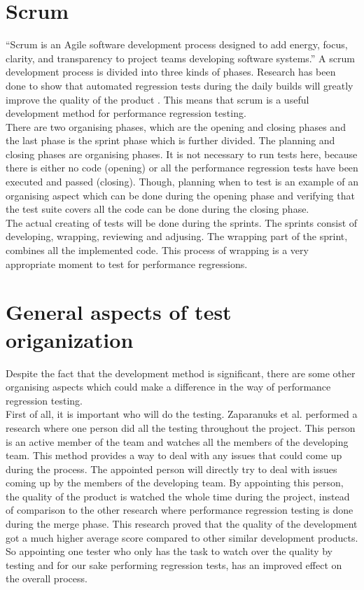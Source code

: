 \section{Scrum}
``Scrum is an Agile software development process designed to add energy, focus, clarity, and transparency to project teams developing software systems.''\cite{sutherland2007distributed} A scrum development process is divided into three kinds of phases. Research has been done to show that automated regression tests during the daily builds will greatly improve the quality of the product \cite{Future_of_Scrum}. This means that scrum is a useful development method for performance regression testing. \\ There are two organising phases, which are the opening and closing phases and the last phase is the sprint phase which is further divided. The planning and closing phases are organising phases. It is not necessary to run tests here, because there is either no code (opening) or all the performance regression tests have been executed and passed (closing). Though, planning when to test is an example of an organising aspect which can be done during the opening phase and verifying that the test suite covers all the code can be done during the closing phase. \\ The actual creating of tests will be done during the sprints. The sprints consist of developing, wrapping, reviewing and adjusing. The wrapping part of the sprint, combines all the implemented code. This process of wrapping is a very appropriate moment to test for performance regressions. \\

\section{General aspects of test origanization}
Despite the fact that the development method is significant, there are some other organising aspects which could make a difference in the way of performance regression testing. \\
First of all, it is important who will do the testing. Zaparanuks et al. performed a research where one person did all the testing throughout the project. \cite{sutherland2009fully} This person is an active member of the team and watches all the members of the developing team. This method provides a way to deal with any issues that could come up during the process. The appointed person will directly try to deal with issues coming up by the members of the developing team. By appointing this person, the quality of the product is watched the whole time during the project, instead of comparison to the other research where performance regression testing is done during the merge phase. This research proved that the quality of the development got a much higher average score compared to other similar development products. So appointing one tester who only has the task to watch over the quality by testing and for our sake performing regression tests, has an improved effect on the overall process. \\

